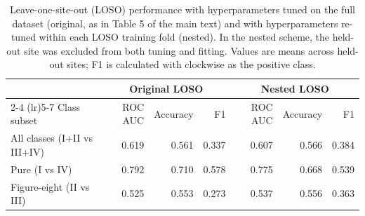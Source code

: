 \begin{table}[H]
\centering
\caption{Leave-one-site-out (LOSO) performance with hyperparameters tuned on the full dataset (original, as in Table 5 of the main text) and with hyperparameters re-tuned within each LOSO training fold (nested). In the nested scheme, the held-out site was excluded from both tuning and fitting. Values are means across held-out sites; F1 is calculated with clockwise as the positive class.}
\label{tab:nested_loso}
\small
\begin{tabular}{lrrrrrr}
\toprule
 & \multicolumn{3}{c}{Original LOSO} & \multicolumn{3}{c}{Nested LOSO} \\
\cmidrule(lr){2-4} \cmidrule(lr){5-7}
Class subset & ROC AUC & Accuracy & F1 & ROC AUC & Accuracy & F1 \\
\midrule
All classes (I+II vs III+IV) & 0.619 & 0.561 & 0.337 & 0.607 & 0.566 & 0.384 \\
Pure (I vs IV) & 0.792 & 0.710 & 0.578 & 0.775 & 0.668 & 0.539 \\
Figure-eight (II vs III) & 0.525 & 0.553 & 0.273 & 0.537 & 0.556 & 0.363 \\
\bottomrule
\end{tabular}
\end{table}

